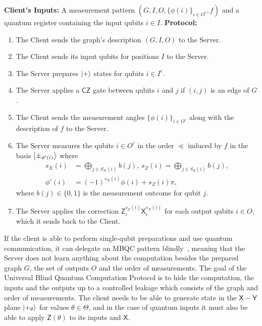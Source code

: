 \documentclass[12pt]{iopart}
\newcommand{\cptp}[1]{\mathsf{#1}} \newcommand{\pd}[1]{\mathcal{#1}}  \newcommand{\sch}[1]{\bm{#1}}
\newcommand{\X}{\cptp{X}}
\newcommand{\Z}{\cptp{Z}}
\newcommand{\Y}{\cptp{Y}}
\renewcommand{\1}{\mathds{1}}
\newcommand{\CZ}{\mathsf{CZ}}
\begin{document}
\begin{protocol}[ht]
  \caption{Delegated MBQC Protocol}\label{proto:mbqc}
  \begin{algorithmic}[0]
    \STATE \textbf{Client's Inputs:} A measurement pattern $(G, I, O, \{\phi(i)\}_{i\in O^c}, f)$ and a quantum register containing the input qubits $i\in I$.
    \STATE \textbf{Protocol:}
    \begin{enumerate}
	\item The Client sends the graph's description $(G, I, O)$ to the Server.
	\item The Client sends its input qubits for positions $I$ to the Server.
    \item The Server prepares $\ket +$ states for qubits $i\in I^c$.
    \item The Server applies a $\CZ$ gate between qubits $i$ and $j$ if $(i,j)$ is an edge of $G$.
    \item The Client sends the measurement angles $\{\phi(i)\}_{i\in O^c}$ along with the description of $f$ to the Server.
    \item The Server measures the qubits $i \in O^c$ in the order $\preceq$ induced by $f$ in the basis $\ket{\pm_{\phi'(i)}}$ where
      \begin{align}
        s_X(i) & = \bigoplus_{j \in S_X(i)} b(j), \ s_Z(i) = \bigoplus_{j \in S_Z(i)} b(j),\\
        \phi'(i) & = (-1)^{s_X(i)}\phi(i) + s_Z(i) \pi, \label{eq:updt-mbqc}
      \end{align}
      where $b(j)\in \{0,1\}$ is the measurement outcome for qubit $j$.
    \item The Server applies the correction $\Z^{s_Z(i)}_i \X^{s_X(i)}_i$ for each output qubits $i \in O$, which it sends back to the Client.
    \end{enumerate}
  \end{algorithmic}
\end{protocol}

If the client is able to perform single-qubit preparations and use quantum communication, it can delegate an MBQC pattern blindly~\cite{BFK09:universal}, meaning that the Server does not learn anything about the computation besides the prepared graph $G$, the set of outputs $O$ and the order of measurements.
The goal of the Universal Blind Quantum Computation Protocol is to hide the computation, the inputs and the outputs up to a controlled leakage which consists of the graph and order of measurements. The client needs to be able to generate state in the $\X - \Y$ plane $\ket{+_\theta}$ for values $\theta \in \Theta$, and in the case of quantum inputs it must also be able to apply $\Z(\theta)$ to its inputs and $\X$.
\end{document}

